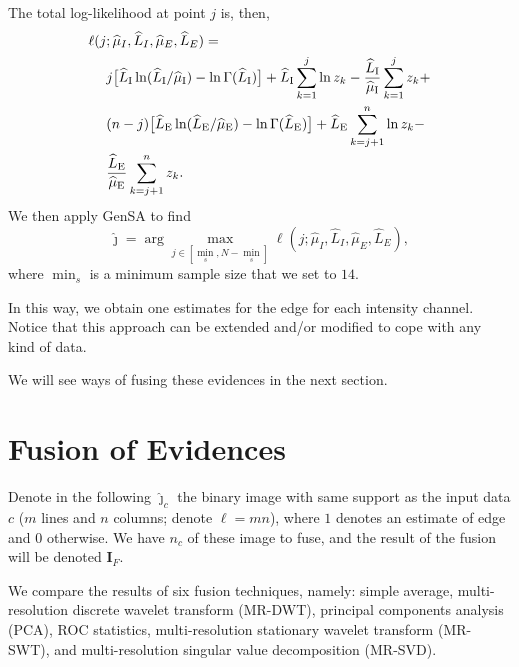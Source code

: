 \documentclass[journal]{IEEEtran}
\begin{document}
The total log-likelihood at point $j$ is, then,
\begin{equation}\label{eq:TotalLogLikelihood}
\begin{split}
\ell(j&;\widehat{\mu}_I, \widehat{L}_I,\widehat{\mu}_E, \widehat{L}_E)=\\
&j \big[\widehat{L}_\text{I}\ln (\widehat{L}_\text{I} / \widehat{\mu}_\text{I}) - \ln \Gamma(\widehat{L}_\text{I})\big]
+\widehat{L}_\text{I} \sum_{k=1}^{j}\ln z_k -\frac{\widehat{L}_\text{I}}{\widehat{\mu}_\text{I}}\sum_{k=1}^{j} z_k +\\
&(n-j) \big[\widehat{L}_\text{E}\ln (\widehat{L}_\text{E} / \widehat{\mu}_\text{E}) - \ln \Gamma(\widehat{L}_\text{E})\big]
+\widehat{L}_\text{E} \sum_{k=j+1}^{n}\ln z_k -\\ &\frac{\widehat{L}_\text{E}}{\widehat{\mu}_\text{E}}\sum_{k=j+1}^{n} z_k.
\raisetag{2.2em}
\end{split}
\end{equation}
We then apply GenSA to find  
$$
\widehat{\jmath}= \arg\max\limits_{j\in [\min_s,N-\min_s]}\ell(j;\widehat{\mu}_I, \widehat{L}_I,\widehat{\mu}_E, \widehat{L}_E),
$$ 
where $\min_s$ is a minimum sample size that we set to $14$.

In this way, we obtain one estimates for the edge for each intensity channel.
Notice that this approach can be extended and/or modified to cope with any kind of data.

We will see ways of fusing these evidences in the next section.

\section{Fusion of Evidences}\label{sec_04}

Denote in the following $\widehat{\bm\jmath}_c$ the binary image with same support as the input data $c$ ($m$ lines and $n$ columns; denote $\ell=mn$), where $1$ denotes an estimate of edge and $0$ otherwise.
We have $n_c$ of these image to fuse, and the result of the fusion will be denoted $\bm I_F$.

We compare the results of six fusion techniques, namely:
simple average, 
multi-resolution discrete wavelet transform (MR-DWT),
principal components analysis (PCA), 
ROC statistics,
multi-resolution stationary wavelet transform (MR-SWT), and
multi-resolution singular value decomposition (MR-SVD).

\end{document}
